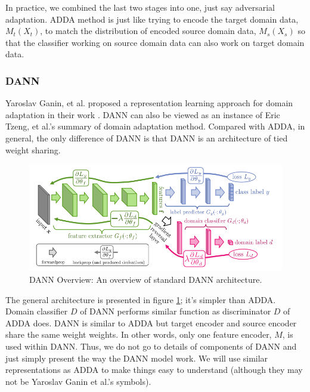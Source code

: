 \documentclass[conference]{IEEEtran}
\begin{document}
    In practice, we combined the last two stages into one, just say adversarial adaptation. ADDA method is just like trying to encode the target domain data, $M_t(X_t)$, to match the distribution of encoded source domain data, $M_s(X_s)$ so that the classifier working on source domain data can also work on target domain data.




\subsubsection{DANN}
Yaroslav Ganin, et al. proposed a representation learning approach for domain adaptation in their work \cite{DANN1}. DANN can also be viewed as an instance of Eric Tzeng, et al.'s summary of domain adaptation method. Compared with ADDA, in general, the only difference of DANN is that DANN is an architecture of tied weight sharing.
\begin{figure}
  \centering
  \includegraphics[width=.8\textwidth]{LDANN_theorem1.jpg}
  \caption{DANN Overview: An overview of standard DANN architecture.}
  \label{DANN_overview}
\end{figure}
The general architecture is presented in figure \ref{DANN_overview}; it's simpler than ADDA. Domain classifier $D$ of DANN performs similar function as discriminator $D$ of ADDA does. DANN is similar to ADDA but target encoder and source encoder share the same weight weights. In other words, only one feature encoder, $M$, is used within DANN. Thus, we do not go to details of components of DANN and just simply present the way the DANN model work. We will use similar representations as ADDA to make things easy to understand (although they may not be Yaroslav Ganin et al.'s symbols).
\end{document}
